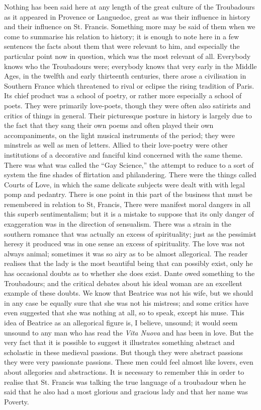 \documentclass{book}
\begin{document}
Nothing has been said here at any length of the great culture of the Troubadours as it appeared in Provence or Languedoc, great as was their influence in history and their influence on St. Francis. Something more may be said of them when we come to summarise his relation to history; it is enough to note here in a few sentences the facts about them that were relevant to him, and especially the particular point now in question, which was the most relevant of all. Everybody knows who the Troubadours were; everybody knows that very early in the Middle Ages, in the twelfth and early thirteenth centuries, there arose a civilisation in Southern France which threatened to rival or eclipse the rising tradition of Paris. Its chief product was a school of poetry, or rather more especially a school of poets. They were primarily love-poets, though they were often also satirists and critics of things in general. Their picturesque posture in history is largely due to the fact that they sang their own poems and often played their own accompaniments, on the light musical instruments of the period; they were minstrels as well as men of letters. Allied to their love-poetry were other institutions of a decorative and fanciful kind concerned with the same theme. There was what was called the “Gay Science,” the attempt to reduce to a sort of system the fine shades of flirtation and philandering. There were the things called Courts of Love, in which the same delicate subjects were dealt with with legal pomp and pedantry. There is one point in this part of the business that must be remembered in relation to St, Francis, There were manifest moral dangers in all this superb sentimentalism; but it is a mistake to suppose that its only danger of exaggeration was in the direction of sensualism. There was a strain in the southern romance that was actually an excess of spirituality; just as the pessimist heresy it produced was in one sense an excess of spirituality. The love was not always animal; sometimes it was so airy as to be almost allegorical. The reader realises that the lady is the most beautiful being that can possibly exist, only he has occasional doubts as to whether she does exist. Dante owed something to the Troubadours; and the critical debates about his ideal woman are an excellent example of these doubts. We know that Beatrice was not his wife, but we should in any case be equally sure that she was not his mistress; and some critics have even suggested that she was nothing at all, so to speak, except his muse. This idea of Beatrice as an allegorical figure is, I believe, unsound; it would seem unsound to any man who has read the \emph{Vita Nuova} and has been in love. But the very fact that it is possible to suggest it illustrates something abstract and scholastic in these medieval passions. But though they were abstract passions they were very passionate passions. These men could feel almost like lovers, even about allegories and abstractions. It is necessary to remember this in order to realise that St. Francis was talking the true language of a troubadour when he said that he also had a most glorious and gracious lady and that her name was Poverty.
\end{document}
